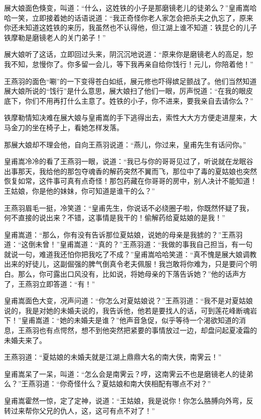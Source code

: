 \documentclass[12pt,oneside]{book}
\begin{document}
展大娘面色倏变，叫道：``什么，这姓铁的小子是那磨镜老儿的徒弟么？''皇甫嵩哈哈一笑，立即接着她的话语说道：``我正奇怪你老人家怎会把杀夫之仇忘了，原来你还未知道这姓铁的来历，我虽然也不认得他，但江湖上谁不知道：铁昆仑的儿子铁摩勒是磨镜老人的关门弟子！''

展大娘听了这话，立即回过头来，阴沉沉地说道：``原来你是磨镜老人的高足，恕我不知，怠慢你了。你多留一会儿，等下我再亲自给你饯行！元儿，你陪着他！''

王燕羽的面色``唰''的一下变得苍白如纸，展元修也吓得嫔足颤战了。他们当然知道展大娘所说的``饯行''是什么意思，展大娘扫了他们一眼，厉声悦道：``在我的眼皮底下，你们不用再打什么主意了。姓铁的小子，你不进来，要我亲自去请你么？''

铁摩勒情知决难在展大娘与皇甫嵩的手下逃得出去，索性大大方方便走进屋来，大马金刀的坐在椅子上，看她怎样发落。

那展大娘却不理会他，自向王燕羽说道：``燕儿，你过来，皇甫先生有话问你。''

皇甫嵩冷冷的看了王燕羽一眼，说道：``我已与你的哥哥见过了，听说就在龙眠谷出事那天，我给他的那包夺魂香的解药突然不翼而飞，那位中了毒的夏姑娘也突然恢复如常，这件事可真有点奇怪！那包药藏在你哥哥的房中，别人决计不能知道！王姑娘，你是他的妹妹，你可知道是谁干的么？''

王燕羽眉毛一挺，冷笑道：``皇甫先生，你说话不必绕圈子啦，你既然怀疑了我，何不直接的说出来？不错，这事情是我干的！偷解药给夏姑娘的是我！''

皇甫嵩道：``那么，你有没有告诉那位夏姑娘，说她的母亲是我掳的？''王燕羽道：``这倒未曾！''皇甫嵩道：``真的？''王燕羽道：``我做的事我自己担当，有一句就说一句，难道我还怕你把我吃了不成？''皇甫嵩哈哈笑道：``真不愧是展大娘调教出来的好徒儿，这副倔强的脾气倒真令老夫佩服！我岂敢将你难为，只是要问个明白。那么，你可露出口风没有，比如说，将她母亲的下落告诉她？''他的话声方了，王燕羽立即答道：``有！''

皇甫嵩面色大变，况声问道：``你怎么对夏姑娘说？''王燕羽道：``我不是对夏姑娘说的，我是对她的未婚夫说的，我告诉他，他若是要找人的话，可到莲花峰断魂岩下！''皇甫嵩道：``她的未婚夫是谁？''他声音急促，似乎等待一个渴欲知道的消息，王燕羽也有点愕然，想不到他突然把紧要的事情放过一边，却盘问起夏凌霜的未婚夫来了。

王燕羽道：``夏姑娘的未婚夫就是江湖上鼎鼎大名的南大侠，南霁云！''

皇甫嵩呆了一呆，叫道：``怎么会是南霁云？哼，这南霁云不也是磨镜老人的徒弟么？''王燕羽道：``你奇怪什么？夏姑娘和南大侠相配有哪点不对？''

皇甫嵩霍然一惊，定了定神，说道：``王姑娘，我是说你！你怎么胳膊向外弯，反转过来帮你父兄的仇人，这，这可有点不对了！''
\end{document}

